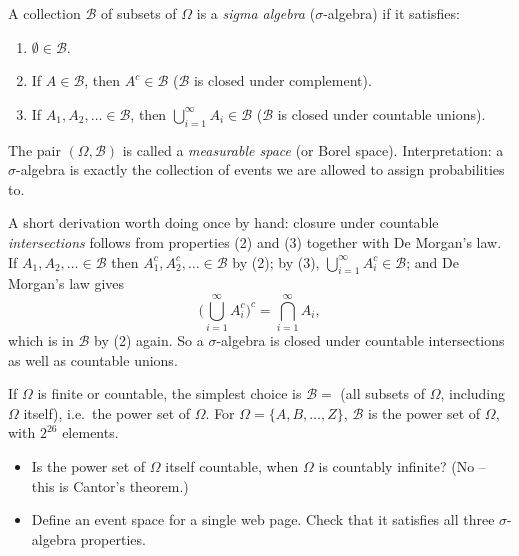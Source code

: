 \documentclass[11pt]{article}
\begin{document}
\begin{definition}
A collection $\mathcal{B}$ of subsets of $\Omega$ is a \emph{sigma algebra}
($\sigma$-algebra) if it satisfies:
\begin{enumerate}
  \item $\emptyset \in \mathcal{B}$.
  \item If $A \in \mathcal{B}$, then $A^c \in \mathcal{B}$ ($\mathcal{B}$ is
        closed under complement).
  \item If $A_1, A_2, \dots \in \mathcal{B}$, then $\bigcup_{i=1}^\infty A_i
        \in \mathcal{B}$ ($\mathcal{B}$ is closed under countable unions).
\end{enumerate}
The pair $(\Omega, \mathcal{B})$ is called a \emph{measurable space} (or
Borel space). Interpretation: a $\sigma$-algebra is exactly the collection
of events we are allowed to assign probabilities to.
\end{definition}

A short derivation worth doing once by hand: closure under countable
\emph{intersections} follows from properties (2) and (3) together with De
Morgan's law. If $A_1, A_2, \dots \in \mathcal{B}$ then $A_1^c, A_2^c, \dots
\in \mathcal{B}$ by (2); by (3), $\bigcup_{i=1}^\infty A_i^c \in \mathcal{B}$;
and De Morgan's law gives
\[
  \Big(\bigcup_{i=1}^\infty A_i^c\Big)^c = \bigcap_{i=1}^\infty A_i,
\]
which is in $\mathcal{B}$ by (2) again. So a $\sigma$-algebra is closed under
countable intersections as well as countable unions.

\begin{example}
If $\Omega$ is finite or countable, the simplest choice is
$\mathcal{B} = $ (all subsets of $\Omega$, including $\Omega$ itself), i.e.\
the power set of $\Omega$. For $\Omega = \{A, B, \dots, Z\}$, $\mathcal{B}$ is
the power set of $\Omega$, with $2^{26}$ elements.
\end{example}

\begin{tryit}
\begin{itemize}[nosep]
  \item Is the power set of $\Omega$ itself countable, when $\Omega$ is
        countably infinite? (No -- this is Cantor's theorem.)
  \item Define an event space for a single web page. Check that it satisfies
        all three $\sigma$-algebra properties.
\end{itemize}
\end{tryit}
\end{document}
